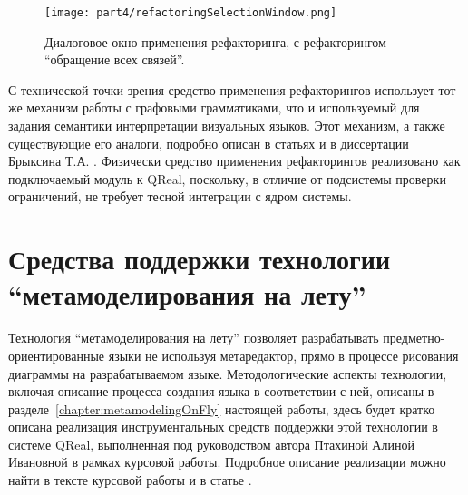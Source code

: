 \begin{figure} [ht]
	\begin{center}
		\texttt{[image: part4/refactoringSelectionWindow.png]}
		\caption{Диалоговое окно применения рефакторинга, с рефакторингом "`обращение всех связей"'.}
		\label{image:refactoringSelectionWindow}
	\end{center}
\end{figure}

С технической точки зрения средство применения рефакторингов использует тот же механизм 
работы с графовыми грамматиками, что и используемый для задания семантики интерпретации 
визуальных языков. Этот механизм, а также существующие его аналоги, подробно описан в статьях
 и в диссертации Брыксина Т.А.
. Физически средство применения рефакторингов реализовано как подключаемый модуль к 
QReal, поскольку, в отличие от подсистемы проверки ограничений, не требует тесной 
интеграции с ядром системы.

\section{Средства поддержки технологии "`метамоделирования на лету"'}
Технология "`метамоделирования на лету"' позволяет разрабатывать предметно-ориентированные 
языки не используя метаредактор, прямо в процессе рисования диаграммы на разрабатываемом 
языке. Методологические аспекты технологии, включая описание процесса создания языка 
в соответствии с ней, описаны в разделе~\ref{chapter:metamodelingOnFly} настоящей 
работы, здесь будет кратко описана реализация инструментальных средств поддержки этой 
технологии в системе QReal, выполненная под руководством автора Птахиной Алиной Ивановной 
в рамках курсовой работы. Подробное описание реализации можно найти в тексте курсовой работы 
и в статье
.

